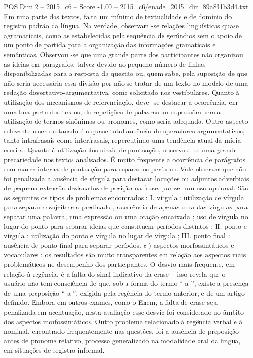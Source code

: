 \begin{textsample}{POS Dim 2 – 2015\_c6 – Score -1.00 – 2015\_c6/enade\_2015\_dir\_89a831b3d4.txt}
Em uma parte dos textos, falta um mínimo de textualidade e de domínio do registro padrão da língua.
Na verdade, observam -se relações linguísticas quase agramaticais, como as estabelecidas pela sequência de gerúndios sem o apoio de um ponto de partida para a organização das informações gramaticais e semânticas.
Observou -se que uma grande parte dos participantes não organizou as ideias em parágrafos, talvez devido ao pequeno número de linhas disponibilizadas para a resposta da questão ou, quem sabe, pela suposição de que não seria necessária essa divisão por não se tratar de um texto no modelo de uma redação dissertativo-argumentativa, como solicitado nos vestibulares.
Quanto à utilização dos mecanismos de referenciação, deve -se destacar a ocorrência, em uma boa parte dos textos, de repetições de palavras ou expressões sem a utilização de termos sinônimos ou pronomes, como seria adequado.
Outro aspecto relevante a ser destacado é a quase total ausência de operadores argumentativos, tanto intrafrasais como interfrasais, repercutindo uma tendência atual da mídia escrita.
Quanto à utilização dos sinais de pontuação, observou -se uma grande precariedade nos textos analisados.
É muito frequente a ocorrência de parágrafos sem marca interna de pontuação para separar os períodos.
Vale observar que não foi penalizada a ausência de vírgula para destacar locuções ou adjuntos adverbiais de pequena extensão deslocados de posição na frase, por ser um uso opcional.
São os seguintes os tipos de problemas encontrados : I. vírgula : utilização de vírgula para separar o sujeito e o predicado ; ocorrência de apenas uma das vírgulas para separar uma palavra, uma expressão ou uma oração encaixada ; uso de vírgula no lugar do ponto para separar ideias que constituem períodos distintos ; II. ponto e vírgula : utilização do ponto e vírgula no lugar de vírgula ; III. ponto final : ausência de ponto final para separar períodos. c ) aspectos morfossintáticos e vocabulares : os resultados são muito transparentes em relação aos aspectos mais problemáticos no desempenho dos participantes.
O desvio mais frequente, em relação à regência, é a falta do sinal indicativo da crase – isso revela que o usuário não tem consciência de que, sob a forma do termo “ a ”, existe a presença de uma preposição “ a ”, exigida pela regência do termo anterior, e de um artigo definido.
Embora em outros exames, como o Enem, a falta de crase seja penalizada em acentuação, nesta avaliação esse desvio foi considerado no âmbito dos aspectos morfossintáticos.
Outro problema relacionado à regência verbal e à nominal, encontrado frequentemente nas questões, foi a ausência de preposição antes de pronome relativo, processo generalizado na modalidade oral da língua, em situações de registro informal.

\end{textsample}
